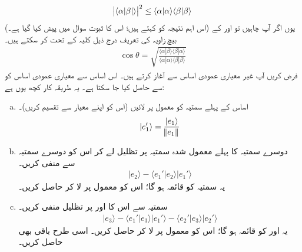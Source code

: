 
\begin{align}\label{ضمیمہ_اندرونی_ضرب_شوارز_عدم_مساوات}
\abs{\langle\alpha|\beta|\rangle}^2\le \langle \alpha |\alpha \rangle \langle\beta|\beta\rangle
\end{align}
(اس  اہم نتیجہ کو  کہتے ہیں؛ اس کا ثبوت سوال  میں پیش کیا گیا ہے۔) یوں اگر آپ چاہیں تو  اور  کے بیچ زاویہ  کی تعریف درج ذیل کلیہ کے تحت کر سکتے ہیں۔
\begin{align}
\cos\theta=\sqrt{\frac{\langle\alpha|\beta\rangle\langle\beta|\alpha\rangle}{\langle\alpha|\alpha\rangle\langle\beta|\beta\rangle}}
\end{align} 
فرض کریں آپ غیر معیاری عمودی اساس   سے آغاز  کرتے  ہیں۔ اس اساس سے معیاری
 عمودی اساس     کو   سے حاصل کیا جا سکتا ہے۔ یہ طریقہ کار کچھ یوں ہے:
 \begin{enumerate}[a.]
 \item
 اساس  کے پہلے  سمتیہ کو  معمول پر لائیں (اس کو اپنے معیار سے تقسیم کریں)۔
 \begin{align*}
 |e_1'\rangle=\frac{|e_1\rangle}{\norm{e_1}}
 \end{align*}
 \item
 دوسرے سمتیہ کا پہلے    معمول شدہ سمتیہ پر تظلیل  لے کر اس کو دوسرے سمتیہ سے منفی کریں۔
 \begin{align*}
 |e_2\rangle-\langle e_1'|e_2\rangle|e_1'\rangle
 \end{align*}
 یہ سمتیہ  کو  قائمہ  ہو گا؛ اس کو معمول پر لا کر  حاصل کریں۔
 \item
 سمتیہ  سے اس کا    اور  پر تظلیل منفی کریں۔
 \begin{align*}
 |e_3\rangle-\langle e_1'|e_3\rangle|e_1'\rangle-\langle e_2'|e_3\rangle|e_2'\rangle
 \end{align*}
 یہ  اور  کو قائمہ  ہو گا؛ اس کو معمول پر لا کر  حاصل کریں۔ اسی طرح باقی بھی حاصل کریں۔
  \end{enumerate}
